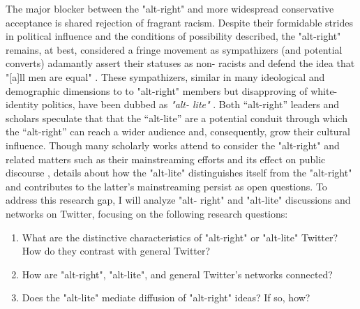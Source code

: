 \documentclass[acmlarge, screen, authorversion]{acmart}
\begin{document}
The major blocker between the "alt-right" and more widespread conservative
acceptance is shared
rejection of fragrant racism. Despite their formidable strides in political
influence and the
conditions of possibility described, the "alt-right" remains, at best,
considered a fringe movement
as sympathizers (and potential converts) adamantly assert their statuses as non-
racists and defend
the idea that "[a]ll men are equal" \cite{mainRiseAltRight2018,
hawleyAltRightWhatEveryone2018}.
These sympathizers, similar in many ideological and demographic dimensions to
to "alt-right" members
but disapproving of white-identity politics, have been dubbed as \textit{"alt-
lite"}
\cite{mainRiseAltRight2018, hawleyAltRightWhatEveryone2018}. Both ``alt-right''
leaders and scholars
speculate that that the ``alt-lite'' are a potential conduit through which the
“alt-right” can reach a wider audience and, consequently, grow their cultural
influence. Though many scholarly works attend to consider the "alt-right" \cite{mainRiseAltRight2018,
hawleyMakingSenseAltright2017, nagleKillAllNormies2017}
and related matters such as their mainstreaming
efforts \cite{gallaherMainstreamingWhiteSupremacy2020} and its effect on public
discourse
\cite{sternProudBoysWhite2019, cammaertsMainstreamingExtremeRightWing2018},
details about how the
"alt-lite" distinguishes itself from the "alt-right" and contributes to the
latter's mainstreaming
persist as open questions. To address this research gap, I will analyze "alt-
right" and "alt-lite"
discussions and networks on Twitter, focusing on the following research
questions:

\begin{enumerate}[font={\bfseries},label={{RQ}\arabic*.}]
	\item What are the distinctive characteristics of "alt-right" or "alt-lite"
  Twitter? How do they contrast with general Twitter?

	\item How are "alt-right", "alt-lite", and general Twitter's networks
  connected?

	\item Does the "alt-lite" mediate diffusion of "alt-right" ideas? If so, how?
\end{enumerate}
\end{document}
